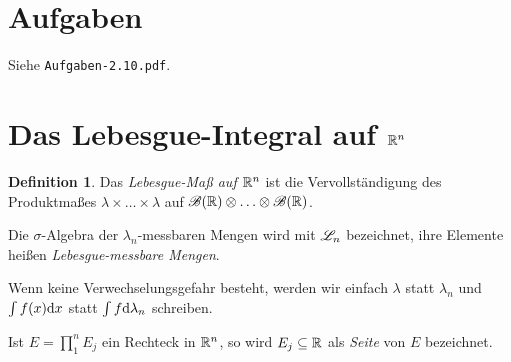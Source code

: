 \documentclass[
 a4paper,
 12pt,
 parskip=half
 ]{scrreprt}
\theoremstyle{plain}
\theoremstyle{definition}
\newtheorem{defn}[thm]{Definition}
\numberwithin{equation}{section}
\begin{document}
\section{Aufgaben}
Siehe \verb+Aufgaben-2.10.pdf+.

\section{Das Lebesgue-Integral auf \texorpdfstring{$\mathbb{R}^n$}{IRn}}
\begin{defn}
 Das \emph{Lebesgue-Maß auf $\mathbb{R}^n$} ist die Vervollständigung des Produktmaßes $\lambda \times \ldots \times \lambda$ auf $\mathscr{B}(\mathbb{R}) \otimes \ldots \otimes \mathscr{B}(\mathbb{R})$.
\end{defn}
 
Die $\sigma$-Algebra der $\lambda_n$-messbaren Mengen wird mit $\mathscr{L}_n$ bezeichnet, ihre Elemente heißen \emph{Lebesgue-messbare Mengen}.
 
Wenn keine Verwechselungsgefahr besteht, werden wir einfach $\lambda$ statt $\lambda_n$ und $\int f(x) \mathrm{d} x$ statt $\int f \mathrm{d} \lambda_n$ schreiben.
 
Ist $E  = \prod_1^n E_j$ ein Rechteck in $\mathbb{R}^n$, so wird $E_j \subseteq \mathbb{R}$ als \emph{Seite} von $E$ bezeichnet.
\end{document}
